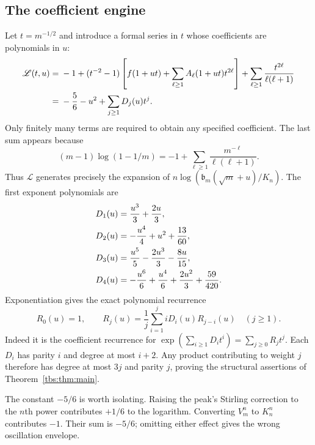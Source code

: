 \documentclass[11pt,a4paper]{article}
\numberwithin{equation}{section}
\theoremstyle{definition}
\newcommand{\bcont}{\mathfrak b}
\begin{document}
\subsection{The coefficient engine}
Let $t=m^{-1/2}$ and introduce a formal series in $t$ whose coefficients
are polynomials in $u$:
\begin{align}\label{tbs:eq:master}
 \mathscr L(t,u)={}&-1+(t^{-2}-1)
 \left[f(1+ut)+\sum_{\ell\ge1}A_\ell(1+ut)t^{2\ell}\right]
 +\sum_{\ell\ge1}\frac{t^{2\ell}}{\ell(\ell+1)}\notag\\
 ={}&-\frac56-u^2+\sum_{j\ge1}D_j(u)t^j.
\end{align}
Only finitely many terms are required to obtain any specified coefficient.
The last sum appears because
\begin{equation}\label{tbs:eq:normalization-shift}
 (m-1)\log(1-1/m)
 =-1+\sum_{\ell\ge1}\frac{m^{-\ell}}{\ell(\ell+1)}.
\end{equation}
Thus $\mathscr L$ generates precisely the expansion of
$n\log(\bcont_m(\sqrt m+u)/K_n)$.
The first exponent polynomials are
\begin{align}
 D_1(u)&=\frac{u^3}{3}+\frac{2u}{3},\notag\\
 D_2(u)&=-\frac{u^4}{4}+u^2+\frac{13}{60},\notag\\
 D_3(u)&=\frac{u^5}{5}-\frac{2u^3}{3}-\frac{8u}{15},\label{tbs:eq:Dexamples}\\
 D_4(u)&=-\frac{u^6}{6}+\frac{u^4}{6}
                         +\frac{2u^2}{3}+\frac{59}{420}.\notag
\end{align}
Exponentiation gives the exact polynomial recurrence
\begin{equation}\label{tbs:eq:Rrecurrence}
 R_0(u)=1,\qquad
 R_j(u)=\frac1j\sum_{i=1}^j iD_i(u)R_{j-i}(u)\quad(j\ge1).
\end{equation}
Indeed it is the coefficient recurrence for
$\exp(\sum_{i\ge1}D_i t^i)=\sum_{j\ge0}R_jt^j$.
Each $D_i$ has parity $i$ and degree at most $i+2$. Any product
contributing to weight $j$ therefore has degree at most $3j$ and parity
$j$, proving the structural assertions of Theorem~\ref{tbs:thm:main}.

The constant $-5/6$ is worth isolating. Raising the peak's Stirling
correction to the $n$th power contributes $+1/6$ to the logarithm.
Converting $V_m^n$ to $K_n^n$ contributes $-1$. Their sum is $-5/6$;
omitting either effect gives the wrong oscillation envelope.
\end{document}

